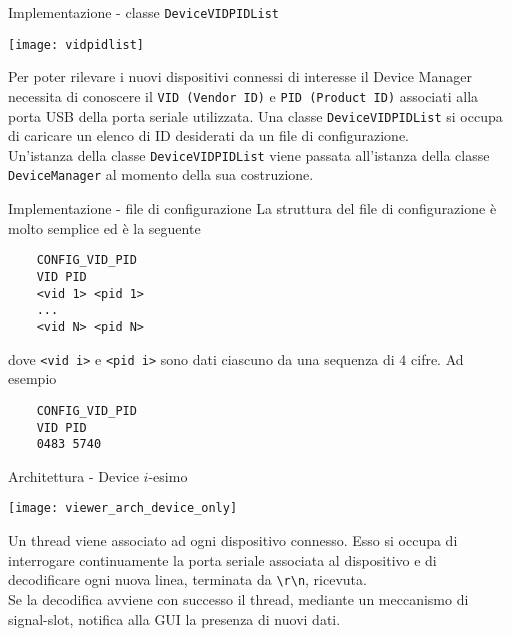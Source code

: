 \begin{frame}[shrink=10]{Implementazione - classe \lstinline!DeviceVIDPIDList!}
  \begin{center}
    \texttt{[image: vidpidlist]}
  \end{center}
  Per poter rilevare i nuovi dispositivi connessi \alert{di interesse} il Device Manager necessita
  di conoscere il \lstinline!VID (Vendor ID)! e \lstinline!PID (Product ID)! associati alla porta
  USB della porta seriale utilizzata. Una classe \lstinline!DeviceVIDPIDList! si occupa di caricare
  un elenco di ID desiderati da un file di configurazione.\\
  Un'istanza della classe \lstinline!DeviceVIDPIDList! viene passata all'istanza della classe
  \lstinline!DeviceManager! al momento della sua costruzione.
\end{frame}

\begin{frame}[fragile]{Implementazione - file di configurazione}
  La struttura del file di configurazione è molto semplice ed è la seguente
  \begin{lstlisting}
    CONFIG_VID_PID
    VID PID
    <vid 1> <pid 1>
    ...
    <vid N> <pid N>
  \end{lstlisting}
  dove \lstinline!<vid i>! e \lstinline!<pid i>! sono dati ciascuno da
  una sequenza di $4$ cifre. Ad esempio
  \begin{lstlisting}
    CONFIG_VID_PID
    VID PID
    0483 5740
  \end{lstlisting}

\end{frame}

\begin{frame}[fragile, shrink=10]{Architettura - Device $i$-esimo}
  \begin{center}
    \texttt{[image: viewer\_arch\_device\_only]}
  \end{center}
  Un thread viene associato ad ogni dispositivo connesso. Esso si occupa di interrogare continuamente
  la porta seriale associata al dispositivo e di decodificare ogni nuova linea, terminata da \lstinline!\r\n!,
  ricevuta.\\
  Se la decodifica avviene con successo il thread, mediante un meccanismo di signal-slot, notifica alla GUI
  la presenza di nuovi dati.
\end{frame}

